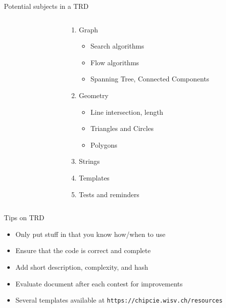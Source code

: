 \documentclass[11pt,pdf, aspectratio=169]{beamer}
\begin{document}
\begin{frame}{Potential subjects in a TRD}
\begin{columns}
\begin{column}{.45\textwidth}
\begin{enumerate}
        \end{enumerate}
      \end{column}
      \begin{column}{.45\textwidth}
        \begin{enumerate}
          \addtocounter{enumi}{5}
          \item Graph
          \begin{itemize}
            \item Search algorithms
            \item Flow algorithms
            \item Spanning Tree, Connected Components
          \end{itemize}
          \item Geometry
          \begin{itemize}
            \item Line intersection, length
            \item Triangles and Circles
            \item Polygons
          \end{itemize}
          \item Strings
          \item Templates
          \item Tests and reminders
        \end{enumerate}
      \end{column}
    \end{columns}
  \end{frame}
  \begin{frame}{Tips on TRD}
    \begin{itemize}
      \item Only put stuff in that you know how/when to use
      \item Ensure that the code is correct and complete
      \item Add short description, complexity, and hash
      \item Evaluate document after each contest for improvements
      \item Several templates available at \texttt{https://chipcie.wisv.ch/resources}
    \end{itemize}
  \end{frame}
\end{document}
